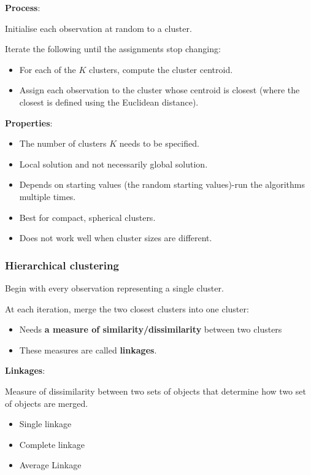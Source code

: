 \noindent\textbf{Process}:

Initialise each observation at random to a cluster.

Iterate the following until the assignments stop changing:

\begin{itemize}
    \item For each of the $K$ clusters, compute the cluster centroid.
    \item Assign each observation to the cluster whose centroid is closest (where the closest is defined using the Euclidean distance).
\end{itemize}

\bigskip 

\noindent\textbf{Properties}:

\begin{itemize}
    \item The number of clusters $K$ needs to be specified.
    \item Local solution and not necessarily global solution.
    \item Depends on starting values (the random starting values)-run the algorithms multiple times.
    \item Best for compact, spherical clusters.
    \item Does not work well when cluster sizes are different.
\end{itemize}

\subsubsection{Hierarchical clustering}

\indent 

Begin with every observation representing a single cluster.

At each iteration, merge the two closest clusters into one cluster:

\begin{itemize}
    \item Needs \textbf{a measure of similarity/dissimilarity} between two clusters
    \item These measures are called \textbf{linkages}.
\end{itemize}

\noindent\textbf{Linkages}: 

Measure of dissimilarity between two sets of objects that determine how two set of objects are merged.

\begin{itemize}
    \item Single linkage
    \item Complete linkage
    \item Average Linkage
\end{itemize}

